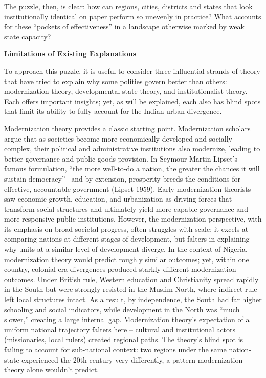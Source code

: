 The puzzle, then, is clear: how can regions, cities, districts and states that look institutionally identical on paper perform so unevenly in practice? What accounts for these “pockets of effectiveness” in a landscape otherwise marked by weak state capacity?

\textbf{Limitations of Existing Explanations}

To approach this puzzle, it is useful to consider three influential strands of theory that have tried to explain why some polities govern better than others: modernization theory, developmental state theory, and institutionalist theory. Each offers important insights; yet, as will be explained, each also has blind spots that limit its ability to fully account for the Indian urban divergence.

Modernization theory provides a classic starting point. Modernization scholars argue that as societies become more economically developed and socially complex, their political and administrative institutions also modernize, leading to better governance and public goods provision. In Seymour Martin Lipset’s famous formulation, “the more well-to-do a nation, the greater the chances it will sustain democracy”– and by extension, prosperity breeds the conditions for effective, accountable government (Lipset 1959). Early modernization theorists saw economic growth, education, and urbanization as driving forces that transform social structures and ultimately yield more capable governance and more responsive public institutions. However, the modernization perspective, with its emphasis on broad societal progress, often struggles with scale: it excels at comparing nations at different stages of development, but falters in explaining why units at a similar level of development diverge. In the context of Nigeria, modernization theory would predict roughly similar outcomes; yet, within one country, colonial-era divergences produced starkly different modernization outcomes. Under British rule, Western education and Christianity spread rapidly in the South but were strongly resisted in the Muslim North, where indirect rule left local structures intact. As a result, by independence, the South had far higher schooling and social indicators, while development in the North was “much slower,” creating a large internal gap. Modernization theory’s expectation of a uniform national trajectory falters here – cultural and institutional actors (missionaries, local rulers) created regional paths. The theory’s blind spot is failing to account for sub-national context: two regions under the same nation-state experienced the 20th century very differently, a pattern modernization theory alone wouldn’t predict.

